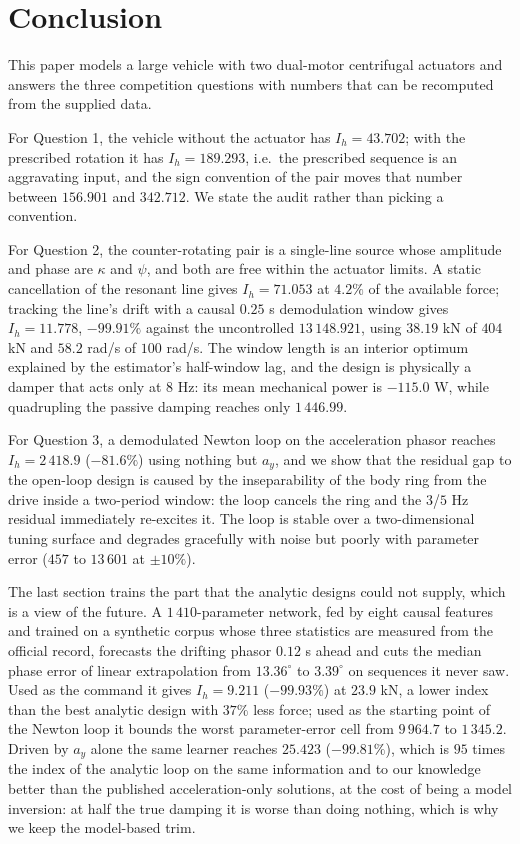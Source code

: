 \documentclass[12pt]{apmcmthesis}
\begin{document}
\section{Conclusion}
This paper models a large vehicle with two dual-motor centrifugal actuators and answers the three
competition questions with numbers that can be recomputed from the supplied data.

For Question 1, the vehicle without the actuator has $I_h=43.702$; with the prescribed rotation it
has $I_h=189.293$, i.e.\ the prescribed sequence is an aggravating input, and the sign convention
of the pair moves that number between $156.901$ and $342.712$. We state the audit rather than
picking a convention.

For Question 2, the counter-rotating pair is a single-line source whose amplitude and phase are
$\kappa$ and $\psi$, and both are free within the actuator limits. A static cancellation of the
resonant line gives $I_h=71.053$ at $4.2\%$ of the available force; tracking the line's drift with
a causal $0.25$ s demodulation window gives $I_h=11.778$, $-99.91\%$ against the uncontrolled
$13\,148.921$, using $38.19$ kN of $404$ kN and $58.2$ rad/s of $100$ rad/s. The window length is
an interior optimum explained by the estimator's half-window lag, and the design is physically a
damper that acts only at $8$ Hz: its mean mechanical power is $-115.0$ W, while quadrupling the
passive damping reaches only $1\,446.99$.

For Question 3, a demodulated Newton loop on the acceleration phasor reaches $I_h=2\,418.9$
($-81.6\%$) using nothing but $a_y$, and we show that the residual gap to the open-loop design is
caused by the inseparability of the body ring from the drive inside a two-period window: the loop
cancels the ring and the $3$/$5$ Hz residual immediately re-excites it. The loop is stable over a
two-dimensional tuning surface and degrades gracefully with noise but poorly with parameter error
($457$ to $13\,601$ at $\pm10\%$).

The last section trains the part that the analytic designs could not supply, which is a view of the
future. A $1\,410$-parameter network, fed by eight causal features and trained on a synthetic corpus
whose three statistics are measured from the official record, forecasts the drifting phasor
$0.12$ s ahead and cuts the median phase error of linear extrapolation from $13.36^\circ$ to
$3.39^\circ$ on sequences it never saw. Used as the command it gives $I_h=9.211$ ($-99.93\%$) at
$23.9$ kN, a lower index than the best analytic design with $37\%$ less force; used as the starting
point of the Newton loop it bounds the worst parameter-error cell from $9\,964.7$ to $1\,345.2$.
Driven by $a_y$ alone the same learner reaches $25.423$ ($-99.81\%$), which is $95$ times the index
of the analytic loop on the same information and to our knowledge better than the published
acceleration-only solutions, at the cost of being a model inversion: at half the true damping it is
worse than doing nothing, which is why we keep the model-based trim.
\end{document}
